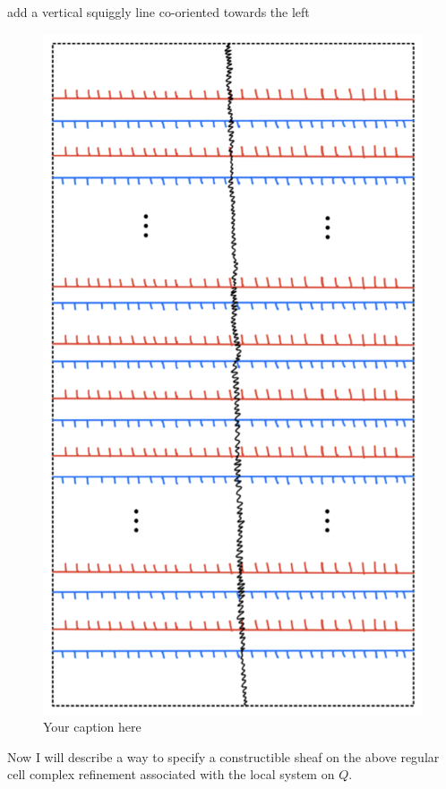 add a vertical squiggly line co-oriented towards the left
\begin{figure}[H] 
    \centering
    \includegraphics[scale = 0.95]{diagrams/local_systems_on_as_diagrams/15.png} 
    \caption{Your caption here}
    \label{fig:your-label}
\end{figure}


Now I will describe a way to specify a constructible sheaf on the above regular cell complex refinement associated with the local system on $Q$. 

